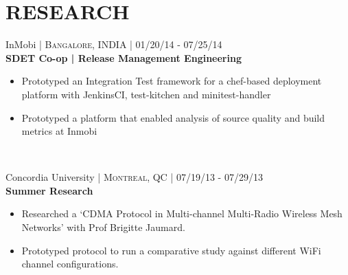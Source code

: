 \documentclass[10pt]{article} %
\begin{document}
{\begin{minipage}[t]{0.57\textwidth}

\section{\uppercase{\textbf{Research}}}



{\raggedright\large InMobi \normalsize\textsc{ | Bangalore, INDIA} | 01/20/14 - 07/25/14\\
\textbf{SDET Co-op | Release Management Engineering}\\[5pt]}
\vspace{0pt}
\begin{itemize}\itemsep-0.25em
    \item Prototyped an Integration Test framework for a chef-based deployment platform with JenkinsCI, test-kitchen and minitest-handler
    \item Prototyped a platform that enabled analysis of source quality and build metrics at Inmobi
\end{itemize}\\



{\raggedright\large Concordia University \normalsize\textsc{ | Montreal, QC | 07/19/13 - 07/29/13}\\
\textbf{Summer Research}\\[5pt]}
\begin{itemize}\itemsep-0.25em
    \item Researched a ‘CDMA Protocol in Multi-channel Multi-Radio Wireless Mesh Networks’ with Prof Brigitte Jaumard.
    \item Prototyped protocol to run a comparative study against different WiFi channel configurations.
\end{itemize}\\


\end{minipage}}
\end{document}
